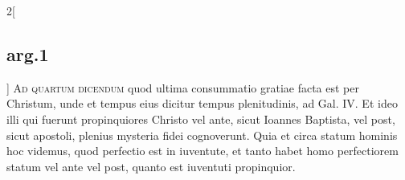 \documentclass[paper=a4paper,fontsize=10pt,jafontsize=9pt,titlepage]{jlreq}
\begin{document}
\begin{paracol}{2}[\subsection{arg.1}]
{\scshape Ad quartum dicendum} quod ultima
consummatio gratiae facta est per Christum, unde et tempus eius dicitur
tempus plenitudinis, ad Gal. IV. Et ideo illi qui fuerunt propinquiores
Christo vel ante, sicut Ioannes Baptista, vel post, sicut apostoli,
plenius mysteria fidei cognoverunt. Quia et circa statum hominis hoc
videmus, quod perfectio est in iuventute, et tanto habet homo
perfectiorem statum vel ante vel post, quanto est iuventuti propinquior.

\switchcolumn



\end{paracol}
\newpage
\end{document}

